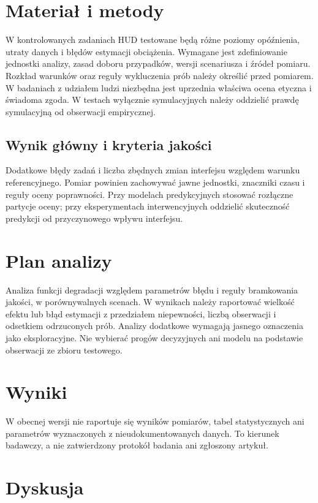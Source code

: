 \documentclass[11pt,a4paper]{article}
\begin{document}
\section{Materiał i metody}

W kontrolowanych zadaniach HUD testowane będą różne poziomy opóźnienia, utraty danych i błędów estymacji obciążenia. Wymagane jest zdefiniowanie jednostki analizy, zasad doboru przypadków, wersji scenariusza i źródeł pomiaru. Rozkład warunków oraz reguły wykluczenia prób należy określić przed pomiarem. W badaniach z udziałem ludzi niezbędna jest uprzednia właściwa ocena etyczna i świadoma zgoda. W testach wyłącznie symulacyjnych należy oddzielić prawdę symulacyjną od obserwacji empirycznej.

\subsection{Wynik główny i kryteria jakości}

Dodatkowe błędy zadań i liczba zbędnych zmian interfejsu względem warunku referencyjnego. Pomiar powinien zachowywać jawne jednostki, znaczniki czasu i reguły oceny poprawności. Przy modelach predykcyjnych stosować rozłączne partycje oceny; przy eksperymentach interwencyjnych oddzielić skuteczność predykcji od przyczynowego wpływu interfejsu.

\section{Plan analizy}

Analiza funkcji degradacji względem parametrów błędu i reguły bramkowania jakości, w porównywalnych scenach. W wynikach należy raportować wielkość efektu lub błąd estymacji z przedziałem niepewności, liczbą obserwacji i odsetkiem odrzuconych prób. Analizy dodatkowe wymagają jasnego oznaczenia jako eksploracyjne. Nie wybierać progów decyzyjnych ani modelu na podstawie obserwacji ze zbioru testowego.

\section{Wyniki}

W obecnej wersji nie raportuje się wyników pomiarów, tabel statystycznych ani parametrów wyznaczonych z nieudokumentowanych danych. To kierunek badawczy, a nie zatwierdzony protokół badania ani zgłoszony artykuł.

\section{Dyskusja}
\end{document}
